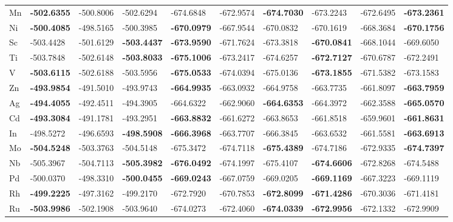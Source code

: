 \begin{table}[htbp]
{\begin{tabular}{l *{9}{l}}
      Mn & \textbf{-502.6355} & -500.8006 & -502.6294 & -674.6848 & -672.9574 & \textbf{-674.7030} & -673.2243 & -672.6495 & \textbf{-673.2361} \\
      Ni & \textbf{-500.4085} & -498.5165 & -500.3985 & \textbf{-670.0979} & -667.9544 & -670.0832 & -670.1619 & -668.3684 & \textbf{-670.1756} \\
      Sc & -503.4428 & -501.6129 & \textbf{-503.4437} & \textbf{-673.9590} & -671.7624 & -673.3818 & \textbf{-670.0841} & -668.1044 & -669.6050 \\
      Ti & -503.7848 & -502.6148 & \textbf{-503.8033} & \textbf{-675.1006} & -673.2417 & -674.6257 & \textbf{-672.7127} & -670.6787 & -672.2491 \\
      V  & \textbf{-503.6115} & -502.6188 & -503.5956 & \textbf{-675.0533} & -674.0394 & -675.0136 & \textbf{-673.1855} & -671.5382 & -673.1583 \\
      Zn & \textbf{-493.9854} & -491.5010 & -493.9743 & \textbf{-664.9935} & -663.0932 & -664.9758 & -663.7735 & -661.8097 & \textbf{-663.7959} \\
      Ag & \textbf{-494.4055} & -492.4511 & -494.3905 & -664.6322 & -662.9060 & \textbf{-664.6353} & -664.3972 & -662.3588 & \textbf{-665.0570} \\
      Cd & \textbf{-493.3084} & -491.1781 & -493.2951 & \textbf{-663.8832} & -661.6272 & -663.8653 & -661.8518 & -659.9601 & \textbf{-661.8631} \\
      In & -498.5272 & -496.6593 & \textbf{-498.5908} & \textbf{-666.3968} & -663.7707 & -666.3845 & -663.6532 & -661.5581 & \textbf{-663.6913} \\
      Mo & \textbf{-504.5248} & -503.3763 & -504.5148 & -675.3472 & -674.7118 & \textbf{-675.4389} & -674.7186 & -672.9335 & \textbf{-674.7397} \\
      Nb & -505.3967 & -504.7113 & \textbf{-505.3982} & \textbf{-676.0492} & -674.1997 & -675.4107 & \textbf{-674.6606} & -672.8268 & -674.5488 \\
      Pd & -500.0370 & -498.3310 & \textbf{-500.0455} & \textbf{-669.0243} & -667.0759 & -669.0205 & \textbf{-669.1169} & -667.3223 & -669.1119 \\
      Rh & \textbf{-499.2225} & -497.3162 & -499.2170 & -672.7920 & -670.7853 & \textbf{-672.8099} & \textbf{-671.4286} & -670.3036 & -671.4181 \\
      Ru & \textbf{-503.9986} & -502.1908 & -503.9640 & -674.0273 & -672.4060 & \textbf{-674.0339} & \textbf{-672.9956} & -672.1332 & -672.9909 \\

\end{tabular}}
\end{table}

